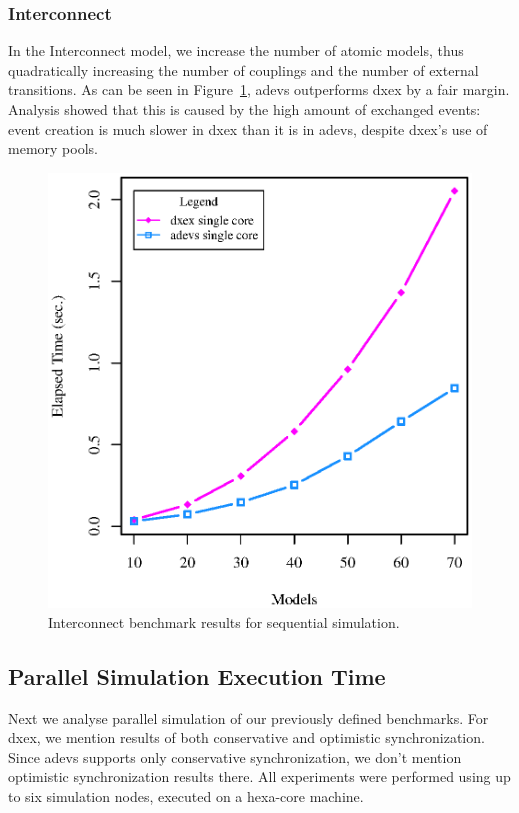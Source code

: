 \subsubsection{Interconnect}
In the Interconnect model, we increase the number of atomic models, thus quadratically increasing the number of couplings and the number of external transitions.
As can be seen in Figure~\ref{fig:Interconnect_benchmark}, adevs outperforms dxex by a fair margin.
Analysis showed that this is caused by the high amount of exchanged events: event creation is much slower in dxex than it is in adevs, despite dxex's use of memory pools.

\begin{figure}
    \center
	\includegraphics[width=\plotfraction\columnwidth]{fig/interconnect_sequential.eps}
	\caption{Interconnect benchmark results for sequential simulation.}
	\label{fig:Interconnect_benchmark}
\end{figure}

\subsection{Parallel Simulation Execution Time}
Next we analyse parallel simulation of our previously defined benchmarks.
For dxex, we mention results of both conservative and optimistic synchronization.
Since adevs supports only conservative synchronization, we don't mention optimistic synchronization results there.
All experiments were performed using up to six simulation nodes, executed on a hexa-core machine.

